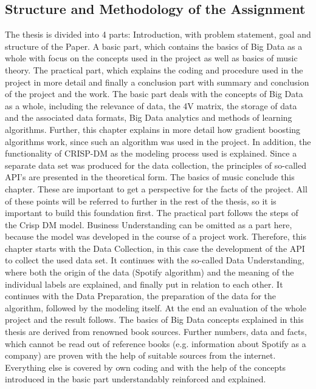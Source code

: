 \subsection{Structure and Methodology of the Assignment}
The thesis is divided into 4 parts: Introduction, with problem statement, goal and structure of the Paper. 
A basic part, which contains the basics of Big Data as a whole with focus on the concepts used in the project as well as basics of music theory. 
The practical part, which explains the coding and procedure used in the project in more detail and finally a conclusion part with summary and conclusion of the project and the work. 
The basic part deals with the concepts of Big Data as a whole, including the relevance of data, the 4V matrix, the storage of data and the associated data formats, 
Big Data analytics and methods of learning algorithms. Further, this chapter explains in more detail how gradient boosting algorithms work, 
since such an algorithm was used in the project. In addition, the functionality of CRISP-DM as the modeling process used is explained. 
Since a separate data set was produced for the data collection, the principles of so-called API's are presented in the theoretical form. 
The basics of music conclude this chapter. These are important to get a perspective for the facts of the project. 
All of these points will be referred to further in the rest of the thesis, so it is important to build this foundation first.
The practical part follows the steps of the Crisp DM model. Business Understanding can be omitted as a part here, because the model was developed in the course of a project work. 
Therefore, this chapter starts with the Data Collection, in this case the development of the API to collect the used data set. 
It continues with the so-called Data Understanding, where both the origin of the data (Spotify algorithm) and the meaning of the individual labels are explained, 
and finally put in relation to each other. It continues with the Data Preparation, the preparation of the data for the algorithm, followed by the modeling itself. 
At the end an evaluation of the whole project and the result follows.
The basics of Big Data concepts explained in this thesis are derived from renowned book sources. 
Further numbers, data and facts, which cannot be read out of reference books (e.g. information about Spotify as a company) 
are proven with the help of suitable sources from the internet. Everything else is covered by own coding and with the help of the concepts introduced in the basic part 
understandably reinforced and explained. 
